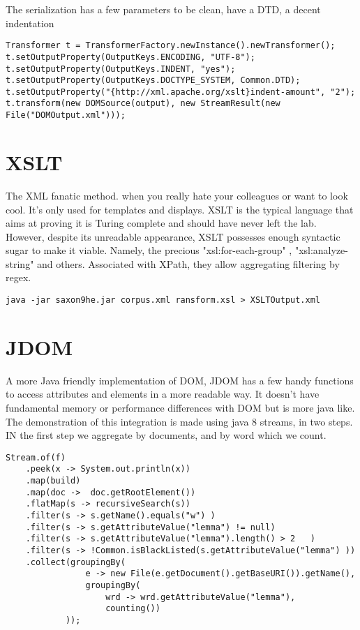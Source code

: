 \documentclass{article}
\begin{document}
The serialization has a few parameters to be clean, have a DTD, a decent indentation

\begin{verbatim}
Transformer t = TransformerFactory.newInstance().newTransformer();
t.setOutputProperty(OutputKeys.ENCODING, "UTF-8");
t.setOutputProperty(OutputKeys.INDENT, "yes");
t.setOutputProperty(OutputKeys.DOCTYPE_SYSTEM, Common.DTD);
t.setOutputProperty("{http://xml.apache.org/xslt}indent-amount", "2");
t.transform(new DOMSource(output), new StreamResult(new File("DOMOutput.xml")));
\end{verbatim}



\section*{XSLT} 
The XML fanatic method. when you really hate your colleagues or want to look cool. It's only used for templates and displays. XSLT is the typical language that aims at proving it is Turing complete and should have never left the lab. However, despite its unreadable appearance, XSLT possesses enough syntactic sugar to make it viable. Namely, the precious "xsl:for-each-group" , "xsl:analyze-string" and others. Associated with XPath, they allow aggregating filtering by regex.
\begin{verbatim}
java -jar saxon9he.jar corpus.xml ransform.xsl > XSLTOutput.xml
\end{verbatim}


\section*{JDOM} 
A more Java friendly implementation of DOM, JDOM has a few handy functions to access attributes and elements in a more readable way. It doesn't have fundamental memory or performance differences with DOM but is more java like. 
The demonstration of this integration is made using java 8 streams, in two steps. 
IN the first step we aggregate by documents, and by word which we count.
\begin{verbatim}
Stream.of(f)
    .peek(x -> System.out.println(x))
    .map(build)
    .map(doc ->  doc.getRootElement())
    .flatMap(s -> recursiveSearch(s))
    .filter(s -> s.getName().equals("w") )							
    .filter(s -> s.getAttributeValue("lemma") != null)
    .filter(s -> s.getAttributeValue("lemma").length() > 2	 )
    .filter(s -> !Common.isBlackListed(s.getAttributeValue("lemma") ))
    .collect(groupingBy(
                e -> new File(e.getDocument().getBaseURI()).getName(),
                groupingBy(	
                    wrd -> wrd.getAttributeValue("lemma"), 
                    counting())
            ));
\end{verbatim}
\end{document}
